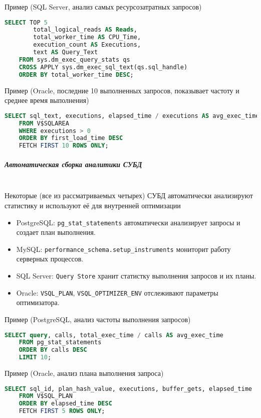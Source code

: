 Пример (SQL Server, анализ самых ресурсозатратных запросов)
\begin{lstlisting}[language=SQL]
    SELECT TOP 5 
        total_logical_reads AS Reads, 
        total_worker_time AS CPU_Time, 
        execution_count AS Executions, 
        text AS Query_Text 
    FROM sys.dm_exec_query_stats qs
    CROSS APPLY sys.dm_exec_sql_text(qs.sql_handle)
    ORDER BY total_worker_time DESC;
\end{lstlisting}

Пример (Oracle, последние 10 выполненных запросов, показывает частоту и среднее время выполнения)
\begin{lstlisting}[language=SQL]
    SELECT sql_text, executions, elapsed_time / executions AS avg_exec_time
    FROM V$SQLAREA
    WHERE executions > 0
    ORDER BY first_load_time DESC
    FETCH FIRST 10 ROWS ONLY;
\end{lstlisting}

\subparagraph{Автоматическая сборка аналитики СУБД} ~\\

Некоторые (все из рассматриваемых четырех) СУБД автоматически анализируют статистику и используют её для внутренней оптимизации
\begin{itemize}
    \item PostgreSQL: \texttt{pg\_stat\_statements} автоматически анализирует запросы и создает план выполнения.
    \item MySQL: \texttt{performance\_schema.setup\_instruments} мониторит работу серверных процессов.
    \item SQL Server: \texttt{Query Store} хранит статистку выполнения запросов и их планы.
    \item Oracle: \texttt{V\textdollar SQL\_PLAN}, \texttt{V\textdollar SQL\_OPTIMIZER\_ENV} отслеживают параметры оптимизатора.
\end{itemize}

Пример (PostgreSQL, анализ частоты выполнения запросов)
\begin{lstlisting}[language=SQL]
    SELECT query, calls, total_exec_time / calls AS avg_exec_time
    FROM pg_stat_statements
    ORDER BY calls DESC
    LIMIT 10;
\end{lstlisting}

Пример (Oracle, анализ плана выполнения запроса)
\begin{lstlisting}[language=SQL]
    SELECT sql_id, plan_hash_value, executions, buffer_gets, elapsed_time
    FROM V$SQL_PLAN
    ORDER BY elapsed_time DESC
    FETCH FIRST 5 ROWS ONLY;
\end{lstlisting}

